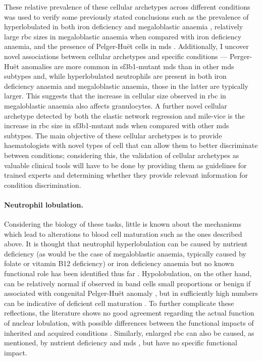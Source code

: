 These relative prevalence of these cellular archetypes across different conditions was used to verify some previously stated conclusions such as the prevalence of hyperlobulated in both iron deficiency and megaloblastic anaemia \cite{Lindenbaum1980 -ux,Westerman1999-gs}, relatively large \ac{rbc} sizes in megaloblastic anaemia when compared with iron deficiency anaemia, and the presence of Pelger-Huët cells in \ac{mds} \cite{Colella2012-so}. Additionally, I uncover novel associations between cellular archetypes and specific conditions --- Perger-Huët anomalies are more common in \ac{sf3b1}-mutant \ac{mds} than in other \ac{mds} subtypes and, while hyperlobulated neutrophils are present in both iron deficiency anaemia and megaloblastic anaemia, those in the latter are typically larger. This suggests that the increase in cellular size observed in \ac{rbc} in megaloblastic anaemia also affects granulocytes. A further novel cellular archetype detected by both the elastic network regression and \ac{mile-vice} is the increase in \ac{rbc} size in \ac{sf3b1}-mutant \ac{mds} when compared with other \ac{mds} subtypes. The main objective of these cellular archetypes is to provide haematologists with novel types of cell that can allow them to better discriminate between conditions; considering this, the validation of cellular archetypes as valuable clinical tools will have to be done by providing them as guidelines for trained experts and determining whether they provide relevant information for condition discrimination.

\paragraph{Neutrophil lobulation.} Considering the biology of these tasks, little is known about the mechanisms which lead to alterations to blood cell maturation such as the ones described above. It is thought that neutrophil hyperlobulation can be caused by nutrient deficiency (as would be the case of megaloblastic anaemia, typically caused by folate or vitamin B12 deficiency) or iron deficiency anaemia but no known functional role has been identified thus far \cite{Manley2018-xo}. Hypolobulation, on the other hand, can be relatively normal if observed in band cells small proportions or benign if associated with congenital Pelger-Huët anomaly \cite{Colella2012-so}, but in sufficiently high numbers can be indicative of deficient cell maturation \cite{Aster2020-cu}. To further complicate these reflections, the literature shows no good agreement regarding the actual function of nuclear lobulation, with possible differences between the functional impacts of inherited and acquired conditions \cite{Manley2018-xo}. Similarly, enlarged \ac{rbc} can also be caused, as mentioned, by nutrient deficiency and \ac{mds} \cite{Aslinia2006-en}, but have no specific functional impact. 

